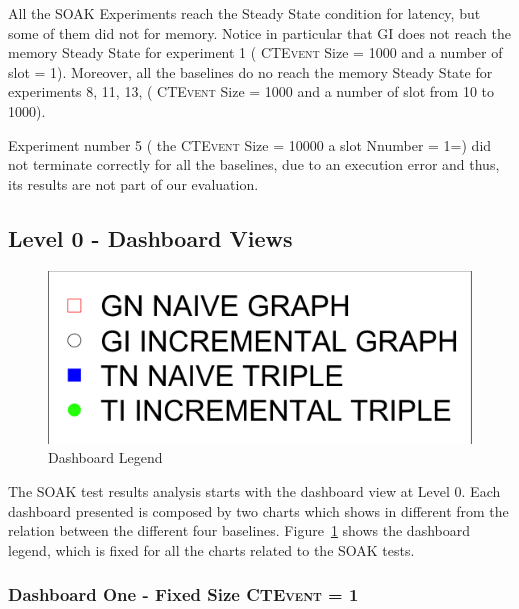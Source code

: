 

All the SOAK Experiments reach the Steady State condition for latency, but some of them did not for memory. Notice in particular that GI does not reach the memory Steady State for experiment 1 (  \textsc{CTEvent}  Size = 1000 and a number of slot = 1). Moreover, all the baselines do no reach the memory  Steady State for experiments 8, 11, 13, ( \textsc{CTEvent}  Size = 1000 and a number of slot from 10 to 1000). 

Experiment number 5 ( the \textsc{CTEvent} Size = 10000 a slot Nnumber = 1=) did not terminate correctly for all the baselines, due to an execution error and thus, its results are not part of our evaluation.

\subsection{Level 0 - Dashboard Views}\label{sec:eval-level0}

\begin{figure}[htb]
	\centering
	\includegraphics[width=0.25\linewidth]{images/dashboard-legend}	
	\caption{Dashboard Legend} 
	\label{fig:dashboard-legend}
\end{figure}

The SOAK test results analysis starts with the dashboard view at Level 0. Each dashboard presented is composed by two charts which shows in different from the relation between the different four baselines.  Figure~\ref{fig:dashboard-legend} shows the dashboard legend, which is fixed for all the charts related to the SOAK tests.

\subsubsection{Dashboard One - Fixed Size \textsc{CTEvent} = 1} 

